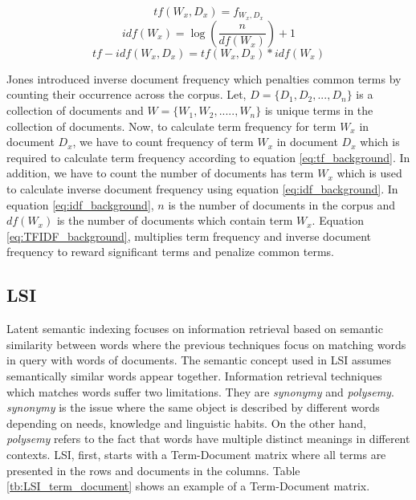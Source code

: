 \begin{equation}
    tf (W_x, D_x) = f_{W_x,D_x}
    \label{eq:tf_background}
\end{equation}
\begin{equation}
    idf(W_x) = \log(\frac{n}{df(W_x)})+1
    \label{eq:idf_background}
\end{equation}
\begin{equation}
    tf-idf(W_x, D_x) = tf(W_x,D_x) * idf(W_x)
    \label{eq:TFIDF_background}
\end{equation}


Jones \cite{jones1972statistical} introduced inverse document frequency which penalties common terms by counting their occurrence across the corpus. Let, $D = \{D_1, D_2, ..., D_n\}$ is a collection of documents and $W = \{W_1, W_2, ....., W_n\}$ is unique terms in the collection of documents. Now, to calculate term frequency for term $W_x$ in document $D_x$, we have to count frequency of term $W_x$ in  document $D_x$ which is required to calculate term frequency according to equation \ref{eq:tf_background}. In addition, we have to count the number of documents has term $W_x$ which is used to calculate inverse document frequency using equation \ref{eq:idf_background}. In equation \ref{eq:idf_background}, $n$ is the number of documents in the corpus and $df(W_x)$ is the number of documents which contain term $W_x$. Equation \ref{eq:TFIDF_background}, multiplies term frequency and inverse document frequency to reward significant terms and penalize common terms. 



\subsection{LSI}
Latent semantic indexing focuses on information retrieval based on semantic similarity between words where the previous techniques focus on matching words in query with words of documents. The semantic concept used in LSI assumes semantically similar words appear together. Information retrieval techniques which matches words suffer two limitations. They are \emph{synonymy} and \emph{polysemy}. \emph{synonymy} is the issue where the same object is described by different words depending on needs, knowledge and linguistic habits. On the other hand, \emph{polysemy} refers to the fact that words have multiple distinct meanings in different contexts. LSI, first, starts with a  Term-Document matrix where all terms are presented in the rows and documents in the columns. Table \ref{tb:LSI_term_document} shows an example of a Term-Document matrix. 

